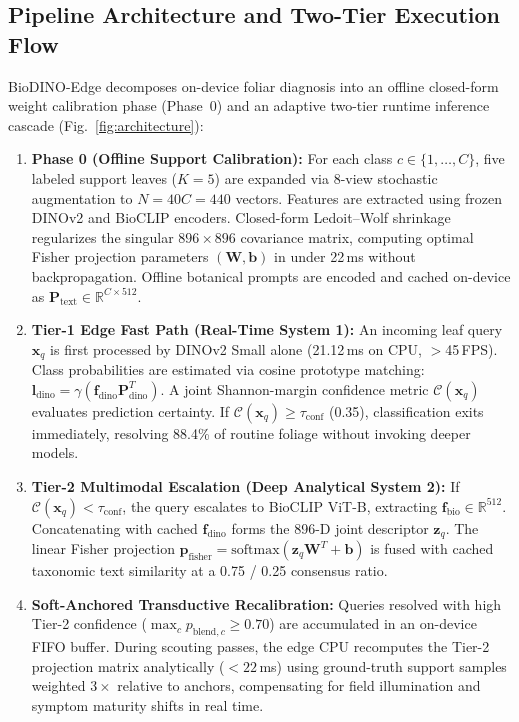 \documentclass[a4paper,fleqn,nologo]{cas-dc}
\begin{document}
\subsection{Pipeline Architecture and Two-Tier Execution Flow}
\label{sec:system_architecture}
BioDINO-Edge decomposes on-device foliar diagnosis into an offline closed-form weight calibration phase (Phase~0) and an adaptive two-tier runtime inference cascade (Fig.~\ref{fig:architecture}):
\begin{enumerate}
    \item \textbf{Phase 0 (Offline Support Calibration):} For each class $c \in \{1, \dots, C\}$, five labeled support leaves ($K=5$) are expanded via 8-view stochastic augmentation to $N = 40C = 440$ vectors. Features are extracted using frozen DINOv2 and BioCLIP encoders. Closed-form Ledoit--Wolf shrinkage regularizes the singular $896 \times 896$ covariance matrix, computing optimal Fisher projection parameters $(\mathbf{W}, \mathbf{b})$ in under 22\,ms without backpropagation. Offline botanical prompts are encoded and cached on-device as $\mathbf{P}_{\text{text}} \in \mathbb{R}^{C \times 512}$.
    \item \textbf{Tier-1 Edge Fast Path (Real-Time System 1):} An incoming leaf query $\mathbf{x}_q$ is first processed by DINOv2 Small alone (21.12\,ms on CPU, $>$45\,FPS). Class probabilities are estimated via cosine prototype matching: $\mathbf{l}_{\text{dino}} = \gamma (\mathbf{f}_{\text{dino}}\mathbf{P}_{\text{dino}}^T)$. A joint Shannon-margin confidence metric $\mathcal{C}(\mathbf{x}_q)$ evaluates prediction certainty. If $\mathcal{C}(\mathbf{x}_q) \ge \tau_{\text{conf}}$ (0.35), classification exits immediately, resolving 88.4\% of routine foliage without invoking deeper models.
    \item \textbf{Tier-2 Multimodal Escalation (Deep Analytical System 2):} If $\mathcal{C}(\mathbf{x}_q) < \tau_{\text{conf}}$, the query escalates to BioCLIP ViT-B, extracting $\mathbf{f}_{\text{bio}} \in \mathbb{R}^{512}$. Concatenating with cached $\mathbf{f}_{\text{dino}}$ forms the 896-D joint descriptor $\mathbf{z}_q$. The linear Fisher projection $\mathbf{p}_{\text{fisher}} = \text{softmax}(\mathbf{z}_q \mathbf{W}^T + \mathbf{b})$ is fused with cached taxonomic text similarity at a 0.75 / 0.25 consensus ratio.
    \item \textbf{Soft-Anchored Transductive Recalibration:} Queries resolved with high Tier-2 confidence ($\max_c p_{\text{blend}, c} \ge 0.70$) are accumulated in an on-device FIFO buffer. During scouting passes, the edge CPU recomputes the Tier-2 projection matrix analytically ($<22$\,ms) using ground-truth support samples weighted $3\times$ relative to anchors, compensating for field illumination and symptom maturity shifts in real time.
\end{enumerate}
\end{document}
